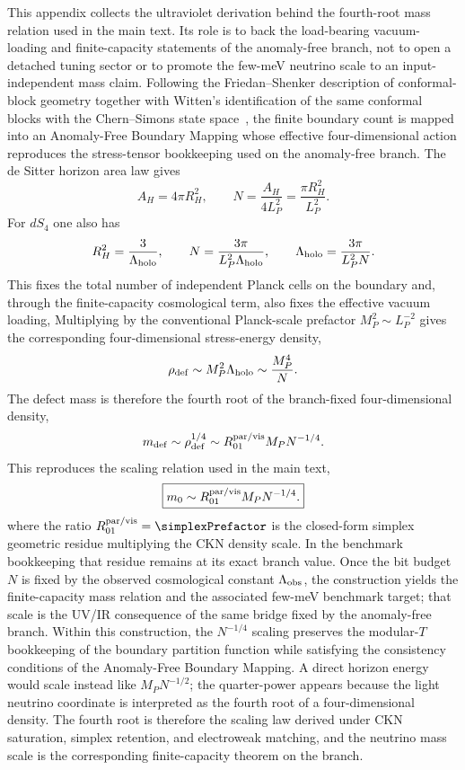 \documentclass[11pt]{article}
\begin{document}
This appendix collects the ultraviolet derivation behind the fourth-root mass relation used in the main text. Its role is to back the load-bearing vacuum-loading and finite-capacity statements of the anomaly-free branch, not to open a detached tuning sector or to promote the few-meV neutrino scale to an input-independent mass claim. Following the Friedan--Shenker description of conformal-block geometry together with Witten's identification of the same conformal blocks with the Chern--Simons state space~\cite{friedan1987,witten1989}, the finite boundary count is mapped into an Anomaly-Free Boundary Mapping whose effective four-dimensional action reproduces the stress-tensor bookkeeping used on the anomaly-free branch. The de Sitter horizon area law gives
\begin{equation}
 A_H = 4\pi R_H^2,
 \qquad
 N = \frac{A_H}{4L_P^2}=\frac{\pi R_H^2}{L_P^2}.
\end{equation}
For $dS_4$ one also has
\begin{equation}
 R_H^2=\frac{3}{\Lambda_{\rm holo}},
 \qquad
 N=\frac{3\pi}{L_P^2\Lambda_{\rm holo}},
 \qquad
 \Lambda_{\rm holo}=\frac{3\pi}{L_P^2N}.
\end{equation}
This fixes the total number of independent Planck cells on the boundary and, through the finite-capacity cosmological term, also fixes the effective vacuum loading,
Multiplying by the conventional Planck-scale prefactor $M_P^2\sim L_P^{-2}$ gives the corresponding four-dimensional stress-energy density,
\begin{equation}
 \rho_{\rm def} \sim M_P^2\Lambda_{\rm holo}\sim \frac{M_P^4}{N}.
\end{equation}
The defect mass is therefore the fourth root of the branch-fixed four-dimensional density,
\begin{equation}
 m_{\rm def}
 \sim
 \rho_{\rm def}^{1/4}
 \sim
 R_{01}^{\rm par/vis} M_P N^{-1/4}.
\end{equation}
This reproduces the scaling relation used in the main text,
\begin{equation}
 \boxed{m_0 \sim R_{01}^{\rm par/vis} M_PN^{-1/4}.}
\end{equation}
where the ratio $R_{01}^{\rm par/vis}=\simplexPrefactor$ is the closed-form simplex geometric residue multiplying the CKN density scale. In the benchmark bookkeeping that residue remains at its exact branch value. Once the bit budget $N$ is fixed by the observed cosmological constant $\Lambda_{\rm obs}$, the construction yields the finite-capacity mass relation and the associated few-meV benchmark target; that scale is the UV/IR consequence of the same bridge fixed by the anomaly-free branch. Within this construction, the $N^{-1/4}$ scaling preserves the modular-$T$ bookkeeping of the boundary partition function while satisfying the consistency conditions of the Anomaly-Free Boundary Mapping. A direct horizon energy would scale instead like $M_PN^{-1/2}$; the quarter-power appears because the light neutrino coordinate is interpreted as the fourth root of a four-dimensional density. The fourth root is therefore the scaling law derived under CKN saturation, simplex retention, and electroweak matching, and the neutrino mass scale is the corresponding finite-capacity theorem on the branch.
\end{document}
